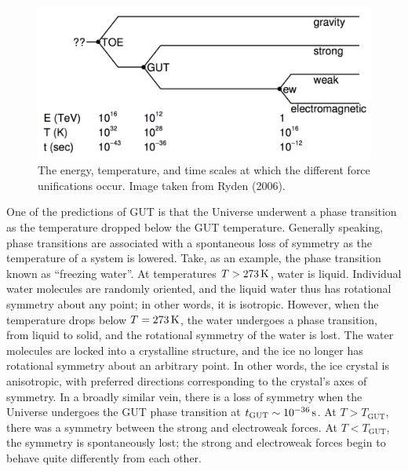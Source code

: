 \documentclass[a4paper,11pt]{article}
\begin{document}
\begin{figure}[h]
    \includegraphics[width=16cm]{figures/GUT.png}
    \centering
    \caption{\footnotesize{The energy, temperature, and time scales at which the different force unifications occur. Image taken from Ryden (2006).}}
    \label{fig:gut}
\end{figure}

{\noindent}One of the predictions of GUT is that the Universe underwent a phase transition as the temperature dropped below the GUT temperature. Generally speaking, phase transitions are associated with a spontaneous loss of symmetry as the temperature of a system is lowered. Take, as an example, the phase transition known as ``freezing water''. At temperatures $T>273\,{\rm K}$, water is liquid. Individual water molecules are randomly oriented, and the liquid water thus has rotational symmetry about any point; in other words, it is isotropic. However, when the temperature drops below $T=273\,{\rm K}$, the water undergoes a phase transition, from liquid to solid, and the rotational symmetry of the water is lost. The water molecules are locked into a crystalline structure, and the ice no longer has rotational symmetry about an arbitrary point. In other words, the ice crystal is anisotropic, with preferred directions corresponding to the crystal’s axes of symmetry. In a broadly similar vein, there is a loss of symmetry when the Universe undergoes the GUT phase transition at $t_\mathrm{GUT}\sim10^{-36}\,{\rm s}$. At $T>T_\mathrm{GUT}$, there was a symmetry between the strong and electroweak forces. At $T<T_\mathrm{GUT}$, the symmetry is spontaneously lost; the strong and electroweak forces begin to behave quite differently from each other.
\end{document}
